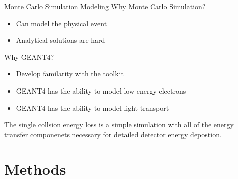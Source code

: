 \documentclass[compress]{beamer}
\begin{document}
\begin{frame}{Monte Carlo Simulation Modeling}
Why Monte Carlo Simulation?
\begin{itemize}
  \item Can model the physical event
  \item Analytical solutions are hard
\end{itemize}
Why GEANT4?
\begin{itemize}
  \item Develop familarity with the toolkit
  \item GEANT4 has the ability to model low energy electrons
  \item GEANT4 has the ability to model light transport
\end{itemize}
\centering
The single collsion energy loss is a simple simulation with all of the energy transfer componenets necessary for detailed detector energy depostion.
\end{frame}
\section{Methods}
\end{document}

